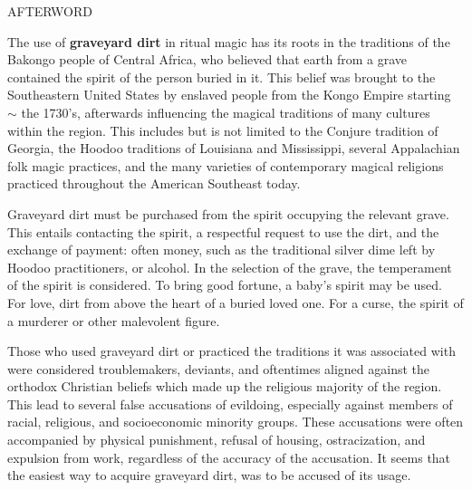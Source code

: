 \documentclass[12pt]{article}
\begin{document}
\vspace*{3\baselineskip}

\begin{center}
\huge AFTERWORD
\end{center}

\vspace*{2\baselineskip}

\begingroup
\hspace{10mm} The use of \textbf{graveyard dirt} in ritual magic has its roots in the traditions of the Bakongo people of Central Africa, who believed that earth from a grave contained the spirit of the person buried in it. This belief was brought to the Southeastern United States by enslaved people from the Kongo Empire starting \(\sim \) the 1730's, afterwards influencing the magical traditions of many cultures within the region. This includes but is not limited to the Conjure tradition of Georgia, the Hoodoo traditions of Louisiana and Mississippi, several Appalachian folk magic practices, and the many varieties of contemporary magical religions practiced throughout the American Southeast today.
\endgroup

\begingroup
\hspace{10mm} Graveyard dirt must be purchased from the spirit occupying the relevant grave. This entails contacting the spirit, a respectful request to use the dirt, and the exchange of payment: often money, such as the traditional silver dime left by Hoodoo practitioners, or alcohol. In the selection of the grave, the temperament of the spirit is considered. To bring good fortune, a baby's spirit may be used. For love, dirt from above the heart of a buried loved one. For a curse, the spirit of a murderer or other malevolent figure.
\endgroup

\begingroup
\hspace{10mm} Those who used graveyard dirt or practiced the traditions it was associated with were considered troublemakers, deviants, and oftentimes aligned against the orthodox Christian beliefs which made up the religious majority of the region. This lead to several false accusations of evildoing, especially against members of racial, religious, and socioeconomic minority groups. These accusations were often accompanied by physical punishment, refusal of housing, ostracization, and expulsion from work, regardless of the accuracy of the accusation. It seems that the easiest way to acquire graveyard dirt, was to be accused of its usage.
\endgroup
\end{document}
